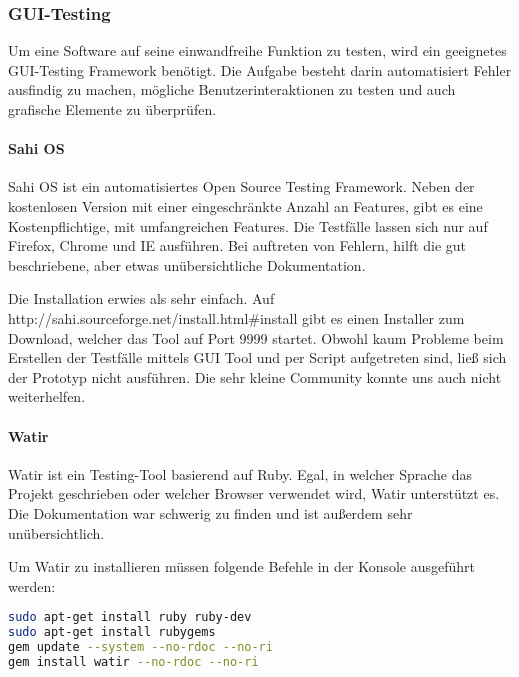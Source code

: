 
\newpage

\subsubsection{GUI-Testing}
Um eine Software auf seine einwandfreihe Funktion zu testen, wird ein geeignetes GUI-Testing Framework benötigt. Die Aufgabe besteht darin automatisiert Fehler ausfindig zu machen, mögliche Benutzerinteraktionen zu testen und auch grafische Elemente zu überprüfen. 

\paragraph{Sahi OS}
Sahi OS ist ein automatisiertes Open Source Testing Framework. Neben der kostenlosen Version mit einer eingeschränkte Anzahl an Features, gibt es eine Kostenpflichtige, mit umfangreichen Features. Die Testfälle lassen sich nur auf Firefox, Chrome und IE ausführen. Bei auftreten von Fehlern, hilft die gut beschriebene, aber etwas unübersichtliche Dokumentation.

Die Installation erwies als sehr einfach. Auf http://sahi.sourceforge.net/install.html\#install gibt es einen Installer zum Download, welcher das Tool auf Port 9999 startet. Obwohl kaum Probleme beim Erstellen der Testfälle mittels GUI Tool und per Script aufgetreten sind, ließ sich der Prototyp nicht ausführen. Die sehr kleine Community konnte uns auch nicht weiterhelfen.

\paragraph{Watir}
Watir ist ein Testing-Tool basierend auf Ruby. Egal, in welcher Sprache das Projekt geschrieben oder welcher Browser verwendet wird, Watir unterstützt es.\\
Die Dokumentation war schwerig zu finden und ist außerdem sehr unübersichtlich. \cite{WATIR}

Um Watir zu installieren müssen folgende Befehle in der Konsole ausgeführt werden: 
\begin{lstlisting}[caption={Installation von Watir \cite{WATIRINSTALL}}, language=bash]
sudo apt-get install ruby ruby-dev
sudo apt-get install rubygems
gem update --system --no-rdoc --no-ri
gem install watir --no-rdoc --no-ri
\end{lstlisting}


